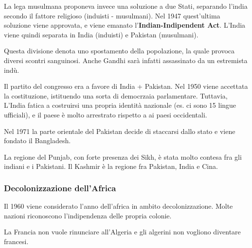 \documentclass[a4paper]{article}
\begin{document}
La lega musulmana proponeva invece una soluzione a due Stati,
separando l'india secondo il fattore religioso (induisti - musulmani).
Nel 1947 quest'ultima soluzione viene approvata, e viene emanato
l'\textbf{Indian-Indipendent Act}. 
L'India viene quindi separata in India (induisti) e Pakistan (musulmani).

Questa divisione denota uno spostamento della popolazione,
la quale provoca diversi scontri sanguinosi.
Anche Gandhi sarà infatti assassinato da un estremista indù.


Il partito del congresso era a favore di India + Pakistan. 
Nel 1950 viene accettata la costituzione, istituendo una sorta di democrzaia parlamentare.
Tuttavia, L'India fatica a costruirsi una propria identità nazionale (es. ci sono 15 lingue ufficiali),
e il paese è molto arrestrato rispetto a ai paesi occidentali.

Nel 1971 la parte orientale del Pakistan decide di staccarsi dallo stato e viene fondato
il Bangladesh.


La regione del Punjab, con forte presenza dei Sikh, è stata molto contesa fra gli
indiani e i Pakistani.
Il Kashmir è la regione fra Pakistan, India e Cina.















\subsubsection{Decolonizzazione dell'Africa}

Il 1960 viene considerato l'anno dell'africa in ambito decolonizzazione.
Molte nazioni riconoscono l'indipendenza delle propria colonie.


La Francia non vuole rinunciare all'Algeria e gli algerini non vogliono diventare francesi.
\end{document}
